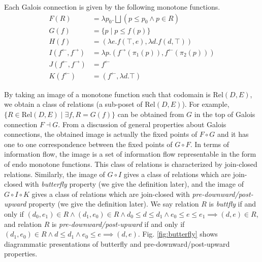 \documentclass{easychair}
\theoremstyle{definition}
\newcommand{\Rel}{\mathrm{Rel}}
\newcommand{\ff}{{f^{\rightarrow}}}
\newcommand{\fb}{{f^{\leftarrow}}}
\newcommand{\bigjoin}{\bigsqcup}
\newcommand{\comp}{\circ}
\begin{document}
Each Galois connection is given by the following monotone functions.
\begin{align*}
  F(R) &= \lambda p_{0}. \bigjoin (p \leq p_{0} \land p \in R) \\
  G(f) &= \{ p \mid p \leq f(p) \} \\
  H(f) &= (\lambda e. f (\top , e) , \lambda d. f (d , \top)) \\
  I(\fb, \ff) &= \lambda p. (\ff (\pi_{1}(p)) , \fb (\pi_{2}(p))) \\
  J(\fb, \ff) &= \fb \\
  K(\fb) &= (\fb , \lambda d. \top)
\end{align*}

By taking an image of a monotone function such that codomain is $\Rel(D, E)$,
we obtain a class of relations (a sub-poset of $\Rel(D, E)$). For
example, $\{ R \in \Rel(D, E) \mid \exists f, R = G(f) \}$ can be obtained from $G$
in the top of Galois connection $F \dashv G$. From a discussion of general
properties about Galois connections, the obtained image is actually the
fixed points of $F \comp G$ and it has one to one correspondence between
the fixed points of $G \comp F$. In terms of information flow, the image
is a set of information flow representable in the form of endo
monotone functions. This class of relations is characterized by join-closed relations.
Similarly, the image of $G \comp I$ gives a class of relations which are join-closed with \emph{butterfly} property (we give the definition later), and the image of $G \comp I \comp K$ gives a class of relations which are join-closed with \emph{pre-downward/post-upward} property (we give the definition later). We say relation $R$ is \emph{buttfly} if and only if $(d_{0}, e_{1}) \in R \land (d_{1}, e_{0}) \in R \land d_{0} \leq d \leq d_{1} \land e_{0} \leq e \leq e_{1} \implies (d , e) \in R$, and relation $R$ is \emph{pre-downward/post-upward} if and only if $(d_{1}, e_{0}) \in R \land d \leq d_{1} \land e_{0} \leq e \implies (d , e)$. Fig. \ref{fig:butterfly} shows diagrammatic presentations of butterfly and pre-downward/post-upward properties.
\end{document}
